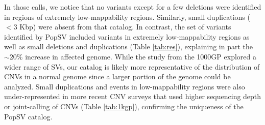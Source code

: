 In those calls, we notice that no variants except for a few deletions were identified in regions of extremely low-mappability regions.
Similarly, small duplications ($<3$ Kbp) were absent from that catalog.
In contrast, the set of variants identified by {\sf PopSV} included variants in extremely low-mappability regions as well as small deletions and duplications (Table \ref{tab:res}), explaining in part the $\sim20\%$ increase in affected genome.
While the study from the 1000GP\cite{Sudmant2015a} explored a wider range of SVs, our catalog is likely more representative of the distribution of CNVs in a normal genome since a larger portion of the genome could be analyzed.
Small duplications and events in low-mappability regions were also under-represented in more recent CNV surveys that used higher sequencing depth or joint-calling of CNVs\cite{Handsaker2015,Chiang2017,Francioli2014} (Table \ref{tab:1kgp}), confirming the uniqueness of the PopSV catalog.


